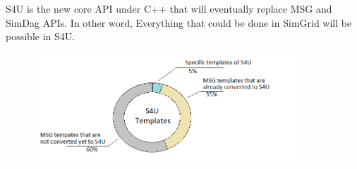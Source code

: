 \begin{frame}%
\begin{block}{}
S4U is the new core API under \textsf{C++} that will eventually replace MSG and SimDag APIs. In other word, Everything that could be done in SimGrid will be possible in S4U.
\end{block}

\begin{figure}
\includegraphics[width=10cm]{figures/s4ud.png}
\end{figure}
\end{frame}